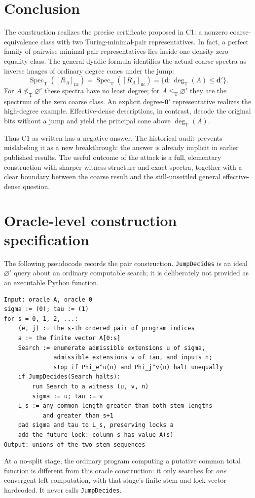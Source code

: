 \documentclass[11pt,a4paper]{article}
\newcommand{\leT}{\leq_{\mathrm T}}
\newcommand{\nleT}{\nleq_{\mathrm T}}
\newcommand{\degT}{\operatorname{deg}_{\mathrm T}}
\newcommand{\Spec}{\operatorname{Spec}_{\mathrm T}}
\newcommand{\nc}{\mathrm{nc}}
\newcommand{\uc}{\mathrm{uc}}
\newcommand{\zero}{\mathbf 0}
\newcommand{\ddeg}{\mathbf d}
\newcommand{\code}[1]{\texttt{#1}}
\theoremstyle{definition}\newtheorem{definition}[theorem]{Definition}
\theoremstyle{remark}\newtheorem{remark}[theorem]{Remark}
\begin{document}
\section{Conclusion}
The construction realizes the precise certificate proposed in C1: a nonzero coarse-equivalence class with two Turing-minimal-pair representatives. In fact, a perfect family of pairwise minimal-pair representatives lies inside one density-zero equality class. The general dyadic formula identifies the actual coarse spectra as inverse images of ordinary degree cones under the jump:
\[
 \Spec([R_A]_{\nc})=\Spec([R_A]_{\uc})
 =\{\ddeg:\degT(A)\leq\ddeg'\}.
\]
For $A\nleT\varnothing'$ these spectra have no least degree; for $A\leT\varnothing'$ they are the spectrum of the zero coarse class. An explicit degree-$\zero'$ representative realizes the high-degree example. Effective-dense descriptions, in contrast, decode the original bits without a jump and yield the principal cone above $\degT(A)$.

Thus C1 as written has a negative answer. The historical audit prevents mislabeling it as a new breakthrough: the answer is already implicit in earlier published results. The useful outcome of the attack is a full, elementary construction with sharper witness structure and exact spectra, together with a clear boundary between the coarse result and the still-unsettled general effective-dense question.

\appendix
\section{Oracle-level construction specification}
\label{app:oracle}
The following pseudocode records the pair construction. \code{JumpDecides} is an ideal $\varnothing'$ query about an ordinary computable search; it is deliberately not provided as an executable Python function.
\begin{lstlisting}
Input: oracle A, oracle 0'
sigma := (0); tau := (1)
for s = 0, 1, 2, ...:
    (e, j) := the s-th ordered pair of program indices
    a := the finite vector A[0:s]
    Search := enumerate admissible extensions u of sigma,
              admissible extensions v of tau, and inputs n;
              stop if Phi_e^u(n) and Phi_j^v(n) halt unequally
    if JumpDecides(Search halts):
        run Search to a witness (u, v, n)
        sigma := u; tau := v
    L_s := any common length greater than both stem lengths
           and greater than s+1
    pad sigma and tau to L_s, preserving locks a
    add the future lock: column s has value A(s)
Output: unions of the two stem sequences
\end{lstlisting}
At a no-split stage, the ordinary program computing a putative common total function is different from this oracle construction: it only searches for \emph{one} convergent left computation, with that stage's finite stem and lock vector hardcoded. It never calls \code{JumpDecides}.
\end{document}
